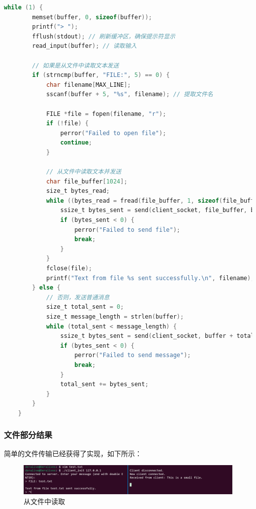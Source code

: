 \documentclass[14pt,a4paper,UTF8,twoside]{article}
\begin{document}
\begin{lstlisting}[language=C, title={Read from File}]
    while (1) {
        memset(buffer, 0, sizeof(buffer));
        printf("> ");
        fflush(stdout); // 刷新缓冲区，确保提示符显示
        read_input(buffer); // 读取输入

        // 如果是从文件中读取文本发送
        if (strncmp(buffer, "FILE:", 5) == 0) {
            char filename[MAX_LINE];
            sscanf(buffer + 5, "%s", filename); // 提取文件名

            FILE *file = fopen(filename, "r");
            if (!file) {
                perror("Failed to open file");
                continue;
            }

            // 从文件中读取文本并发送
            char file_buffer[1024];
            size_t bytes_read;
            while ((bytes_read = fread(file_buffer, 1, sizeof(file_buffer), file)) > 0) {
                ssize_t bytes_sent = send(client_socket, file_buffer, bytes_read, 0); // 逐块发送文件内容
                if (bytes_sent < 0) {
                    perror("Failed to send file");
                    break;
                }
            }
            fclose(file);
            printf("Text from file %s sent successfully.\n", filename);
        } else {
            // 否则，发送普通消息
            size_t total_sent = 0;
            size_t message_length = strlen(buffer);
            while (total_sent < message_length) {
                ssize_t bytes_sent = send(client_socket, buffer + total_sent, message_length - total_sent, 0);
                if (bytes_sent < 0) {
                    perror("Failed to send message");
                    break;
                }
                total_sent += bytes_sent;
            }
        }
    }
\end{lstlisting}

\subsubsection*{文件部分结果}

简单的文件传输已经获得了实现，如下所示：

\begin{figure}[H]
    \centering
    \includegraphics[width=0.9\linewidth]{lab7/file.png}
    \caption{从文件中读取}
    \label{fig:file}
\end{figure}
\end{document}
